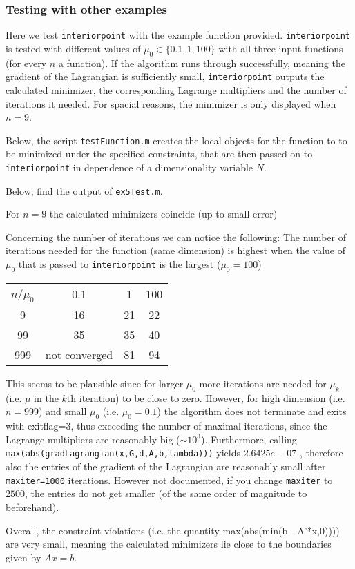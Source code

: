 \documentclass{article}
\begin{document}
\subsubsection{Testing with other examples}
Here we test \texttt{interiorpoint} with the example function provided. \texttt{interiorpoint} is tested with different values of $\mu_0\in\lbrace0.1,1,100\rbrace$ with all three input functions (for every $n$ a function). If the algorithm runs through successfully, meaning the gradient of the Lagrangian is sufficiently small, \texttt{interiorpoint} outputs the calculated minimizer, the corresponding Lagrange multipliers and the number of iterations it needed. For spacial reasons, the minimizer is only displayed when $n=9$.
 
Below, the script \texttt{testFunction.m} creates the local objects for the function to to be minimized under the specified constraints, that are then passed on to \texttt{interiorpoint} in dependence of a dimensionality variable $N$.

Below, find the output of \texttt{ex5Test.m}. 

For $n=9$ the calculated minimizers coincide (up to small error)
\par
Concerning the number of iterations we can notice the following:  The number of iterations needed for the function (same dimension) is highest when the value of $\mu_0$ that is passed to \texttt{interiorpoint} is the largest ($\mu_0=100$)
\begin{center}
        \begin{tabular}{|c|c|c|c|}
        \hline
        $n$/$\mu_0$&0.1&1&100\\
        9&16&21&22\\
        99&35&35&40\\
        999&not converged&81&94\\
        \hline
        \end{tabular}
        \end{center}
This seems to be plausible since for larger $\mu_0$ more iterations are needed for $\mu_k$ (i.e. $\mu$ in the $k$th iteration) to be close to zero. However, for high dimension (i.e.$n=999$) and small $\mu_0$ (i.e. $\mu_0=0.1$) the algorithm does not terminate and exits with exitflag=3, thus exceeding the number of maximal iterations, since the Lagrange multipliers are reasonably big ($\sim10^3$). Furthermore, calling \texttt{max(abs(gradLagrangian(x,G,d,A,b,lambda)))} yields $2.6425e-07$ , therefore also the entries of the gradient of the Lagrangian are reasonably small after \texttt{maxiter=1000} iterations. However not documented, if you change \texttt{maxiter} to $2500$, the entries do not get smaller (of the same order of magnitude to beforehand).\par
Overall, the constraint violations (i.e. the quantity max(abs(min(b - A’*x,0)))) are very small, meaning the calculated minimizers lie close to the boundaries given by $Ax=b$.
\end{document}
